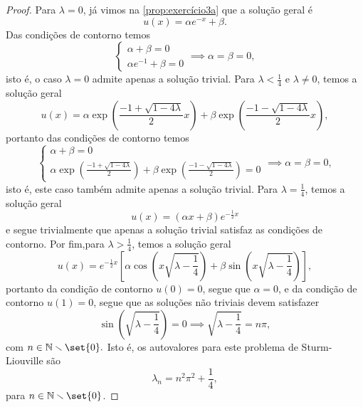 \begin{proof}
    Para \(\lambda = 0\), já vimos na \cref{prop:exercício3a} que a solução geral é
    \begin{equation*}
        u(x) = \alpha e^{-x} + \beta.
    \end{equation*}
    Das condições de contorno temos
    \begin{equation*}
        \begin{cases}
            \alpha + \beta = 0\\
            \alpha e^{-1} + \beta = 0
        \end{cases}\implies \alpha = \beta = 0,
    \end{equation*}
    isto é, o caso \(\lambda = 0\) admite apenas a solução trivial. Para \(\lambda < \frac14\) e \(\lambda \neq 0\), temos a solução geral
    \begin{equation*}
        u(x) = \alpha \exp\left(\frac{-1 + \sqrt{1 - 4 \lambda}}{2}x\right) + \beta \exp\left(\frac{-1 - \sqrt{1 - 4 \lambda}}{2}x\right),
    \end{equation*}
    portanto das condições de contorno temos
    \begin{equation*}
        \begin{cases}
            \alpha + \beta = 0\\
        \alpha \exp\left(\frac{-1 + \sqrt{1 - 4 \lambda}}{2}\right) + \beta \exp\left(\frac{-1 - \sqrt{1 - 4 \lambda}}{2}\right) = 0
        \end{cases}\implies \alpha = \beta = 0,
    \end{equation*}
    isto é, este caso também admite apenas a solução trivial. Para \(\lambda = \frac14\), temos a solução geral
    \begin{equation*}
        u(x) = (\alpha x + \beta)e^{- \frac12 x}
    \end{equation*}
    e segue trivialmente que apenas a solução trivial satisfaz as condições de contorno. Por fim,para \(\lambda > \frac14\), temos a solução geral
    \begin{equation*}
        u(x) = e^{-\frac12x}\left[\alpha \cos\left(x\sqrt{\lambda - \frac14}\right) + \beta \sin\left(x\sqrt{\lambda - \frac14}\right)\right],
    \end{equation*}
    portanto da condição de contorno \(u(0) = 0\), segue que \(\alpha = 0\), e da condição de contorno \(u(1) = 0\), segue que as soluções não triviais devem satisfazer
    \begin{equation*}
        \sin\left(\sqrt{\lambda - \frac14}\right) = 0 \implies \sqrt{\lambda - \frac14} = n\pi,
    \end{equation*}
    com \(n \in \mathbb{N}\smallsetminus\set{0}.\) Isto é, os autovalores para este problema de Sturm-Liouville são
    \begin{equation*}
        \lambda_n = n^2 \pi^2 + \frac14,
    \end{equation*}
    para \(n \in \mathbb{N} \smallsetminus\set{0}\).


\end{proof}
